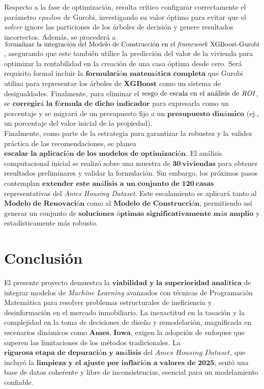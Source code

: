 Respecto a la fase de optimización, resulta crítico configurar correctamente el parámetro $epsilon$ de Gurobi, investigando su valor óptimo para evitar que el \textit{solver} ignore las particiones de los árboles de decisión y genere resultados incorrectos. Además, se procederá a $\mathbf{\text{formalizar la integración del Modelo de Construcción en el \textit{framework} XGBoost-Gurobi}}$, asegurando que este también utilice la predicción del valor de la vivienda para optimizar la rentabilidad en la creación de una casa óptima desde cero. Será requisito formal incluir la $\mathbf{\text{formulación matemática completa}}$ que Gurobi utiliza para representar los árboles de $\mathbf{XGBoost}$ como un sistema de desigualdades. Finalmente, para eliminar el $\mathbf{\text{sesgo de escala en el análisis de \textit{ROI}}}$, se $\mathbf{\text{corregirá la fórmula de dicho indicador}}$ para expresarla como un porcentaje y se migrará de un presupuesto fijo a un $\mathbf{\text{presupuesto dinámico}}$ (ej., un porcentaje del valor inicial de la propiedad). 
\\Finalmente, como parte de la estrategia para garantizar la robustez y la validez práctica de las recomendaciones, se planea $\mathbf{\text{escalar la aplicación de los modelos de optimización}}$. El análisis computacional inicial se realizó sobre una muestra de $\mathbf{30 \ viviendas}$ para obtener resultados preliminares y validar la formulación. Sin embargo, los próximos pasos contemplan $\mathbf{\text{extender este análisis a un conjunto de } 120 \ \text{casas}}$ representativas del \textit{Ames Housing Dataset}. Este escalamiento se aplicará tanto al $\mathbf{\text{Modelo de Renovación}}$ como al $\mathbf{\text{Modelo de Construcción}}$, permitiendo así generar un conjunto de $\mathbf{\text{soluciones óptimas significativamente más amplio}}$ y estadísticamente más robusto. 

\section{Conclusión \label{sec:sec2}}
El presente proyecto demuestra la $\mathbf{\text{viabilidad y la superioridad analítica}}$ de integrar modelos de \textit{Machine Learning} avanzados con técnicas de Programación Matemática para resolver problemas estructurales de ineficiencia y desinformación en el mercado inmobiliario. La inexactitud en la tasación y la complejidad en la toma de decisiones de diseño y remodelación, magnificada en escenarios dinámicos como $\mathbf{\text{Ames, Iowa}}$, exigen la adopción de enfoques que superen las limitaciones de los métodos tradicionales. La $\mathbf{\text{rigurosa etapa de depuración y análisis}}$ del $\textit{Ames Housing Dataset}$, que incluyó la $\mathbf{\text{limpieza y el ajuste por inflación a valores de 2025}}$, sentó una base de datos coherente y libre de inconsistencias, esencial para un modelamiento confiable.

